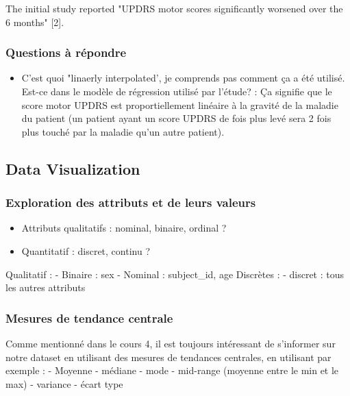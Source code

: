 \documentclass[11pt]{article}
\providecommand{\tightlist}{%
      \setlength{\itemsep}{0pt}\setlength{\parskip}{0pt}}
\begin{document}
The initial study reported "UPDRS motor scores significantly worsened
over the 6 months" {[}2{]}.

    \subsubsection{Questions à répondre}\label{questions-uxe0-ruxe9pondre}

\begin{itemize}
\tightlist
\item
  C'est quoi "linaerly interpolated', je comprends pas comment ça a été
  utilisé. Est-ce dans le modèle de régression utilisé par l'étude? : Ça
  signifie que le score motor UPDRS est proportiellement linéaire à la
  gravité de la maladie du patient (un patient ayant un score UPDRS de
  fois plus levé sera 2 fois plus touché par la maladie qu'un autre
  patient).
\end{itemize}

    \subsection{Data Visualization}\label{data-visualization}

    \subsubsection{Exploration des attributs et de leurs
valeurs}\label{exploration-des-attributs-et-de-leurs-valeurs}

    \begin{itemize}
\tightlist
\item
  Attributs qualitatifs : nominal, binaire, ordinal ?
\item
  Quantitatif : discret, continu ?
\end{itemize}

Qualitatif : - Binaire : sex - Nominal : subject\_id, age Discrètes : -
discret : tous les autres attributs

    \subsubsection{Mesures de tendance
centrale}\label{mesures-de-tendance-centrale}

    Comme mentionné dans le cours 4, il est toujours intéressant de
s'informer sur notre dataset en utilisant des mesures de tendances
centrales, en utilisant par exemple : - Moyenne - médiane - mode -
mid-range (moyenne entre le min et le max) - variance - écart type
\end{document}
